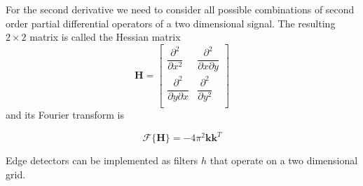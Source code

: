 		For the second derivative we need to consider all possible combinations of second order partial differential operators of a two dimensional signal. The resulting $2 \times 2$ matrix is called the Hessian matrix
		\begin{equation}
			\mathbf{H} = 
				\begin{bmatrix}
   \dfrac{\partial^2}{\partial x^2}       & \dfrac{\partial^2}{\partial x \partial y}\\
   \dfrac{\partial^2}{\partial y \partial x}       & \dfrac{\partial^2}{\partial y^2}\\
				\end{bmatrix}
				\label{eq:hessian_def}
		\end{equation}
		and its Fourier transform is
		
		\begin{equation}
			\mathscr{F}\{\mathbf{H}\} = -4 \pi^2 \mathbf{k}\mathbf{k}^T
		\end{equation}
		
		
		Edge detectors can be implemented as filters $h$ that operate on a two dimensional grid. 
%		
%				
%			
			
